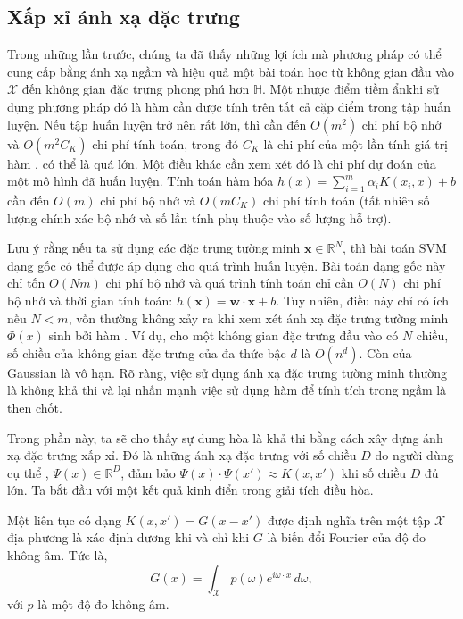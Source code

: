 \subsection{Xấp xỉ ánh xạ đặc trưng \protect{}}

Trong những lần trước, chúng ta đã thấy những lợi ích mà phương pháp
 có thể cung cấp bằng ánh xạ ngầm và hiệu quả một bài toán học từ
không gian đầu vào $\mathcal{X}$ đến không gian đặc trưng phong phú hơn
$\mathbb{H}$. Một nhược điểm tiềm ẩnkhi sử dụng phương pháp  đó là
hàm  cần được tính trên tất cả cặp điểm trong tập huấn luyện. Nếu
tập huấn luyện trở nên rất lớn, thì cần đến $O(m^2)$ chi phí bộ nhớ và
$O(m^2C_K)$ chi phí tính toán, trong đó $C_K$ là chi phí của một lần tính giá
trị hàm , có thể là quá lớn. Một điều khác cần xem xét đó là chi phí
dự đoán của một mô hình đã huấn luyện. Tính toán hàm  hóa $h(x) =
\sum_{i = 1}^m \alpha_i K(x_i, x) + b$ cần đến $O(m)$ chi phí bộ nhớ và
$O(mC_K)$ chi phí tính toán (tất nhiên số lượng chính xác bộ nhớ và số lần tính
phụ thuộc vào số lượng  hỗ trợ).

Lưu ý rằng nếu ta sử dụng các  đặc trưng tường minh $\mathbf{x} \in
\mathbb{R}^N$, thì bài toán SVM dạng gốc có thể được áp dụng cho quá trình huấn
luyện. Bài toán dạng gốc này chỉ tốn $O(Nm)$ chi phí bộ nhớ và quá trình tính
toán chỉ cần $O(N)$ chi phí bộ nhớ và thời gian tính toán: $h(\mathbf{x}) =
\mathbf{w}\cdot \mathbf{x} + b$. Tuy nhiên, điều này chỉ có ích nếu $N < m$,
vốn thường không xảy ra khi xem xét ánh xạ đặc trưng tường minh $\Phi(x)$ sinh
bởi hàm . Ví dụ, cho một không gian đặc trưng đầu vào có $N$ chiều,
số chiều của không gian đặc trưng  của  đa thức bậc $d$
là $O(n^d)$. Còn của  Gaussian là vô hạn. Rõ ràng, việc sử dụng ánh
xạ đặc trưng  tường minh thường là không khả thi và lại nhấn mạnh
việc sử dụng hàm  để tính tích trong ngầm là then chốt.

Trong phần này, ta sẽ cho thấy sự dung hòa là khả thi bằng cách xây dựng ánh xạ
đặc trưng  xấp xỉ. Đó là những ánh xạ đặc trưng với số chiều $D$ do
người dùng cụ thể , $\Psi(x) \in \mathbb{R}^D$, đảm bảo $\Psi(x) \cdot \Psi(x')
\approx K(x, x')$ khi số chiều $D$ đủ lớn. Ta bắt đầu với một kết quả kinh điển
trong giải tích điều hòa.

\begin{thm}
  \label{thm:bochner}
  Một  liên tục có dạng $K(x, x') = G(x - x')$ được định nghĩa trên
  một tập $\mathcal{X}$  địa phương là xác định dương khi và chỉ
  khi $G$ là biến đổi Fourier của độ đo không âm. Tức là, \begin{equation}
    G(x) = \int_{\mathcal{X}} p(\omega)e^{i\omega\cdot x}\, d\omega,
  \end{equation}với $p$ là một độ đo không âm.
\end{thm}

